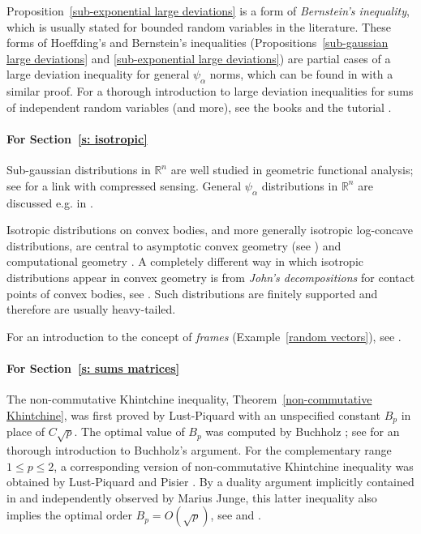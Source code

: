 \documentclass[10pt, openany]{book}
\theoremstyle{remark}
\def \R {\mathbb{R}}
\def \a {\alpha}
\begin{document}
Proposition~\ref{sub-exponential large deviations} is a form of {\em Bernstein's inequality},
which is usually stated for bounded random variables in the literature. 
These forms of Hoeffding's and Bernstein's inequalities 
(Propositions~\ref{sub-gaussian large deviations} and \ref{sub-exponential large deviations})
are partial cases of a large deviation inequality for general $\psi_\a$ norms, 
which can be found in \cite[Corollary~2.10]{Talagrand canonical} with a similar proof.
For a thorough introduction to large deviation inequalities for sums of independent random variables (and more),
see the books \cite{Petrov, Ledoux-Talagrand, Dembo-Zeitouni} and the tutorial \cite{BBL}. 


\paragraph{For Section~\ref{s: isotropic}}

Sub-gaussian distributions in $\R^n$ are well studied in geometric functional analysis;
see \cite{MePaTJ reconstruction} for a link with compressed sensing. 
General $\psi_\alpha$ distributions in $\R^n$ are discussed e.g. in \cite{GiMi concentration}.

Isotropic distributions on convex bodies, and more generally isotropic log-concave distributions, 
are central to asymptotic convex geometry (see \cite{Giannopoulos isotropic, Paouris})
and computational geometry \cite{Vempala}. 
A completely different way in which isotropic distributions appear in convex geometry is from 
{\em John's decompositions} for contact points of convex bodies, see \cite{Ball, Rudelson contact, Vershynin John}.
Such distributions are finitely supported and therefore are usually heavy-tailed.

For an introduction to the concept of {\em frames} (Example~\ref{random vectors}), 
see \cite{KC, Christensen}.
 

\paragraph{For Section~\ref{s: sums matrices}}

The non-commutative Khintchine inequality, Theorem~\ref{non-commutative Khintchine},
was first proved by Lust-Piquard \cite{Lust-Piquard} with an unspecified constant $B_p$ 
in place of $C \sqrt{p}$.
The optimal value of $B_p$ was computed by Buchholz \cite{Buc01, Buc05}; 
see \cite[Section~6.5]{Rauhut structured} for an thorough introduction to Buchholz's argument.
For the complementary range $1 \le p \le 2$, a corresponding version of non-commutative Khintchine 
inequality was obtained by Lust-Piquard and Pisier \cite{Lu-Pi}. 
By a duality argument implicitly contained in \cite{Lu-Pi} and independently observed by Marius Junge, 
this latter inequality also implies the optimal order $B_p = O(\sqrt{p})$, 
see \cite{Rudelson isotropic} and \cite[Section~9.8]{Pisier operator}.
\end{document}
